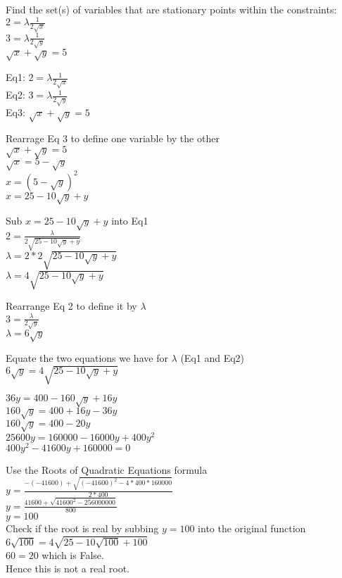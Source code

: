 \documentclass[11pt]{article}
\begin{document}
Find the set(s) of variables that are stationary points within the
constraints:\\
\(2 = \lambda \frac{1}{2\sqrt{x}}\)\\
\(3 = \lambda \frac{1}{2\sqrt{y}}\)\\
\(\sqrt{x} + \sqrt{y} = 5\)

Eq1: \(2 = \lambda \frac{1}{2\sqrt{x}}\)\\
Eq2: \(3 = \lambda \frac{1}{2\sqrt{y}}\)\\
Eq3: \(\sqrt{x} + \sqrt{y} = 5\)

Rearrage Eq 3 to define one variable by the other\\
\(\sqrt{x} + \sqrt{y} = 5\)\\
\(\sqrt{x} = 5 - \sqrt{y}\)\\
\(x = (5 - \sqrt{y})^2\)\\
\(x = 25 - 10\sqrt{y} + y\)

Sub \(x = 25 - 10\sqrt{y} + y\) into Eq1\\
\(2 = \frac{\lambda}{2\sqrt{25 - 10\sqrt{y} + y}}\)\\
\(\lambda= 2*2\sqrt{25 - 10\sqrt{y} + y}\)\\
\(\lambda= 4\sqrt{25 - 10\sqrt{y} + y}\)

Rearrange Eq 2 to define it by \(\lambda\)\\
\(3 = \frac{\lambda}{2\sqrt{y}}\)\\
\(\lambda = 6\sqrt{y}\)

Equate the two equations we have for \(\lambda\) (Eq1 and Eq2)\\
\(6\sqrt{y} = 4\sqrt{25 - 10\sqrt{y} + y}\)

    \(36y= 400-160\sqrt{y}+16y\)\\
\(160\sqrt{y} = 400+16y-36y\)\\
\(160\sqrt{y} = 400-20y\)\\
\(25600y = 160000-16000y + 400y^2\)\\
\(400y^2 - 41600y + 160000 = 0\)

Use the Roots of Quadratic Equations formula\\
\(y = \frac {- (-41600)+\sqrt{(-41600)^2-4*400*160000}}{2*400}\)\\
\(y = \frac {41600+\sqrt{41600^2-256000000}}{800}\)\\
\(y = 100\)\\
Check if the root is real by subbing \(y = 100\) into the original
function \(6\sqrt{100} = 4\sqrt{25 - 10\sqrt{100} + 100}\)\\
\(60 = 20\) which is False.\\
Hence this is not a real root.
\end{document}
